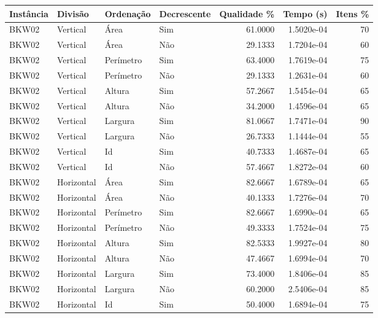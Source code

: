 \begin{tabular}{llllrrr}
\hline
Instância & Divisão     & Ordenação & Decrescente & Qualidade \% & Tempo (s)  & Itens \% \\
\hline
BKW02     & Vertical    & Área      & Sim         & 61.0000      & 1.5020e-04 & 70       \\
BKW02     & Vertical    & Área      & Não         & 29.1333      & 1.7204e-04 & 60       \\
BKW02     & Vertical    & Perímetro & Sim         & 63.4000      & 1.7619e-04 & 75       \\
BKW02     & Vertical    & Perímetro & Não         & 29.1333      & 1.2631e-04 & 60       \\
BKW02     & Vertical    & Altura    & Sim         & 57.2667      & 1.5454e-04 & 65       \\
BKW02     & Vertical    & Altura    & Não         & 34.2000      & 1.4596e-04 & 65       \\
BKW02     & Vertical    & Largura   & Sim         & 81.0667      & 1.7471e-04 & 90       \\
BKW02     & Vertical    & Largura   & Não         & 26.7333      & 1.1444e-04 & 55       \\
BKW02     & Vertical    & Id        & Sim         & 40.7333      & 1.4687e-04 & 65       \\
BKW02     & Vertical    & Id        & Não         & 57.4667      & 1.8272e-04 & 60       \\
BKW02     & Horizontal  & Área      & Sim         & 82.6667      & 1.6789e-04 & 65       \\
BKW02     & Horizontal  & Área      & Não         & 40.1333      & 1.7276e-04 & 70       \\
BKW02     & Horizontal  & Perímetro & Sim         & 82.6667      & 1.6990e-04 & 65       \\
BKW02     & Horizontal  & Perímetro & Não         & 49.3333      & 1.7524e-04 & 75       \\
BKW02     & Horizontal  & Altura    & Sim         & 82.5333      & 1.9927e-04 & 80       \\
BKW02     & Horizontal  & Altura    & Não         & 47.4667      & 1.6994e-04 & 70       \\
BKW02     & Horizontal  & Largura   & Sim         & 73.4000      & 1.8406e-04 & 85       \\
BKW02     & Horizontal  & Largura   & Não         & 60.2000      & 2.5406e-04 & 85       \\
BKW02     & Horizontal  & Id        & Sim         & 50.4000      & 1.6894e-04 & 75       \\

\end{tabular}

